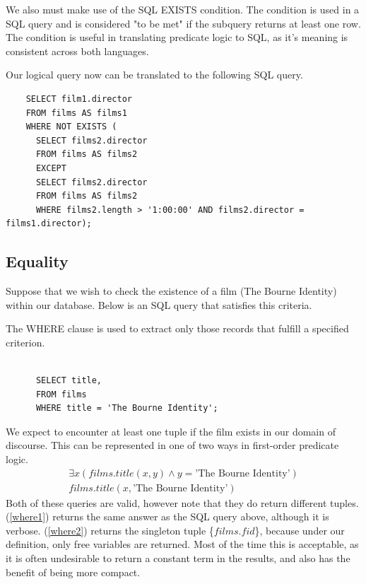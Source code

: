 \documentclass[a4paper, 11pt]{article}
\begin{document}
    We also must make use of the SQL EXISTS condition. The condition
    is used in a SQL query and is considered "to be met" if the subquery
    returns at least one row.\cite{technetEXISTS} The condition is useful in
    translating predicate logic to SQL, as it's meaning is consistent across
    both languages. 

    Our logical query now can be translated to the following SQL query.
    \begin{verbatim}
    SELECT film1.director
    FROM films AS films1
    WHERE NOT EXISTS (
      SELECT films2.director
      FROM films AS films2
      EXCEPT
      SELECT films2.director
      FROM films AS films2
      WHERE films2.length > '1:00:00' AND films2.director = films1.director);
    \end{verbatim}

    \subsection{Equality}

      Suppose that we wish to check the existence of a film (The Bourne
      Identity) within our database. Below is an SQL query that satisfies this
      criteria.

      The WHERE clause is used to extract only those records that fulfill a
      specified criterion.~\cite{w3WHERE} 


      \begin{verbatim}

      SELECT title,
      FROM films
      WHERE title = 'The Bourne Identity';

      \end{verbatim}

      We expect to encounter at least one tuple if the film exists in our domain
      of discourse.  This can be represented
      in one of two ways in first-order predicate logic.
      \begin{gather}
        \exists x(films.title(x, y) \land y = \text{'The Bourne
        Identity'})\label{where1}\\
        films.title(x, \text{'The Bourne Identity'})\label{where2}
      \end{gather}
      Both of these queries are valid, however note that they do return different
      tuples. (\ref{where1}) returns the same answer as the SQL query above, although
      it is verbose. (\ref{where2}) returns the singleton tuple \{$films.fid$\},
      because under our definition, only free variables are returned. Most of
      the time this is acceptable, as it is often undesirable to return a
      constant term in the results, and also has the benefit of being more
      compact.
\end{document}
